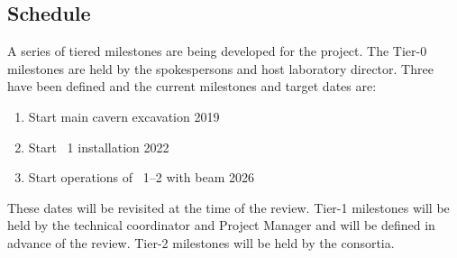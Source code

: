 \subsection{Schedule}
\label{sec:fdsp-coord-controls}

A series of tiered milestones are being developed for the 
project. The Tier-0 milestones are held by the spokespersons and host
laboratory director. Three have been defined and the current milestones and
target dates are:
\begin{enumerate}
\item Start main cavern excavation \hspace{2.1in} 2019
\item Start ~1 installation \hspace{2.1in} 2022
\item Start operations of ~1--2 with beam \hspace{1in} 2026
\end{enumerate}
These dates will be revisited at the time of the  review.  Tier-1
milestones will be held by the technical coordinator and  Project
Manager and will be defined in advance of the  review. Tier-2
milestones will be held by the consortia.

